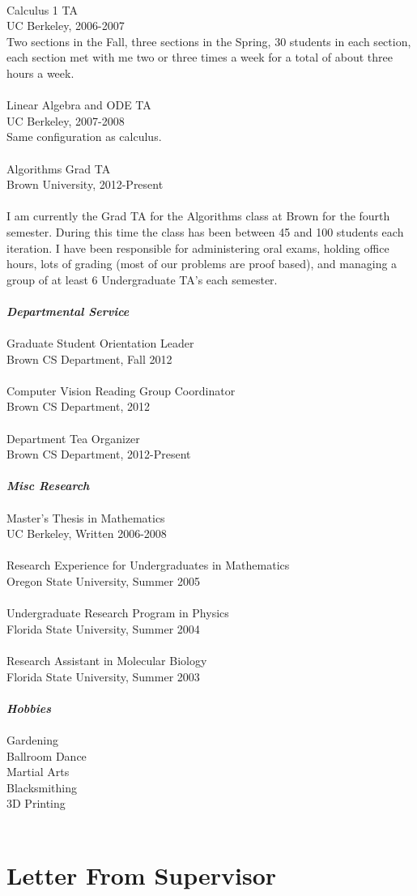 \documentclass[12pt]{article}
\numberwithin{equation}{section}
\numberwithin{table}{section}
\numberwithin{figure}{section}
\begin{document}
\\
Calculus 1 TA\\
UC Berkeley, 2006-2007\\
Two sections in the Fall, three sections in the Spring, 30 students in each section, each section met with me
two or three times a week for a total of about three hours a week.\\
 \\
Linear Algebra and ODE TA\\
UC Berkeley, 2007-2008\\
Same configuration as calculus.\\
 \\
Algorithms Grad TA\\
Brown University, 2012-Present\\
\\
I am currently the Grad TA for the Algorithms class at Brown for the fourth semester. During this time the class has been
between 45 and 100 students each iteration.  I have been responsible for administering oral exams, holding office hours,
lots of grading (most of our problems are proof based), and managing a group of at least 6 Undergraduate TA's each semester.\\
 \\
\textbf{\emph{Departmental Service}}\\
 \\
Graduate Student Orientation Leader\\
Brown CS Department, Fall 2012\\
 \\
Computer Vision Reading Group Coordinator\\
Brown CS Department, 2012\\
 \\
Department Tea Organizer\\
Brown CS Department, 2012-Present\\
 \\
\textbf{\emph{Misc Research}}\\
 \\
Master's Thesis in Mathematics\\
UC Berkeley, Written 2006-2008\\
 \\
Research Experience for Undergraduates in Mathematics\\
Oregon State University, Summer 2005\\
 \\
Undergraduate Research Program in Physics\\
Florida State University, Summer 2004\\
 \\
Research Assistant in Molecular Biology\\
Florida State University, Summer 2003\\
 \\
\textbf{\emph{Hobbies}}\\
 \\
Gardening\\
Ballroom Dance\\
Martial Arts\\
Blacksmithing\\
3D Printing\\
 \\
\newpage

\section{Letter From Supervisor}

\newpage
\end{document}
